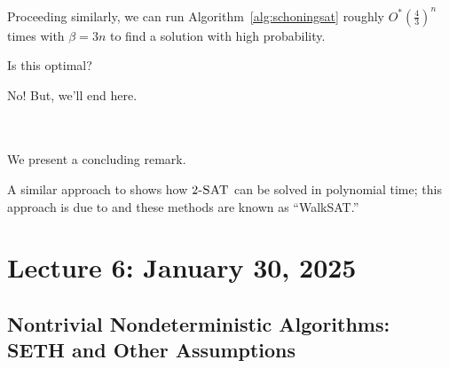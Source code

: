         Proceeding similarly, we can run Algorithm~\ref{alg:schoningsat} roughly \(O^*\left(\frac{4}{3}\right)^n\) times with \(\beta=3n\) to find a solution with high probability.
        \begin{question*}
            Is this optimal?
        \end{question*}
        \begin{answer*}
            No! But, we'll end here.
        \end{answer*}
        \vphantom
        \\
        \\
        We present a concluding remark.
        \begin{remark*}
            A similar approach to \cite{schoning1999probabilisticksat} shows how \(2\textsc{-SAT}\) can be solved in polynomial time; this approach is due to \cite{papadimitriou1991walksat} and these methods are known as ``WalkSAT.''
        \end{remark*}

\pagebreak
        
\section{Lecture 6: January 30, 2025}

    \subsection{Nontrivial Nondeterministic Algorithms: SETH and Other Assumptions}

